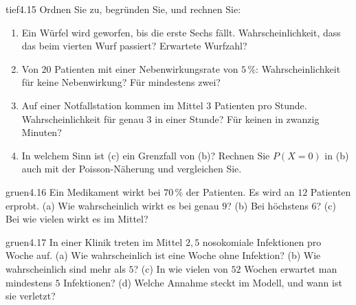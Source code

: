 \begin{karte}{tief}{4.15}{\typtypisch}{}
Ordnen Sie zu, begründen Sie, und rechnen Sie:
\begin{enumerate}[label=(\alph*),leftmargin=1.6em,itemsep=2pt]
\item Ein Würfel wird geworfen, bis die erste Sechs fällt. Wahrscheinlichkeit, dass das beim vierten Wurf passiert? Erwartete Wurfzahl?
\item Von $20$ Patienten mit einer Nebenwirkungsrate von $5\,\%$: Wahrscheinlichkeit für keine Nebenwirkung? Für mindestens zwei?
\item Auf einer Notfallstation kommen im Mittel $3$ Patienten pro Stunde. Wahrscheinlichkeit für genau $3$ in einer Stunde? Für keinen in zwanzig Minuten?
\item In welchem Sinn ist (c) ein Grenzfall von (b)? Rechnen Sie $P(X = 0)$ in (b) auch mit der Poisson-Näherung und vergleichen Sie.
\end{enumerate}
\end{karte}

\begin{karte}{gruen}{4.16}{\typwerk}{}
Ein Medikament wirkt bei $70\,\%$ der Patienten. Es wird an $12$ Patienten erprobt. (a) Wie wahrscheinlich wirkt es bei genau $9$? (b) Bei höchstens $6$? (c) Bei wie vielen wirkt es im Mittel?
\end{karte}

\begin{karte}{gruen}{4.17}{\typwerk}{}
In einer Klinik treten im Mittel $2{,}5$ nosokomiale Infektionen pro Woche auf. (a) Wie wahrscheinlich ist eine Woche ohne Infektion? (b) Wie wahrscheinlich sind mehr als $5$? (c) In wie vielen von $52$ Wochen erwartet man mindestens $5$ Infektionen? (d) Welche Annahme steckt im Modell, und wann ist sie verletzt?
\end{karte}

